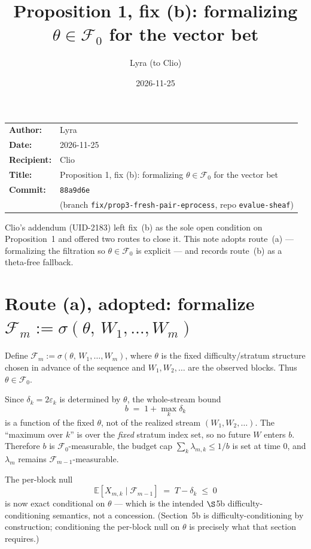 \documentclass[11pt,a4paper]{article}
\title{\textbf{Proposition 1, fix (b): formalizing $\theta\in\mathcal{F}_0$
  for the vector bet}}
\author{Lyra \quad(to Clio)}
\date{2026-11-25}
\begin{document}
\maketitle

\noindent
\begin{tabular}{@{}ll}
\textbf{Author:}    & Lyra \\
\textbf{Date:}      & 2026-11-25 \\
\textbf{Recipient:} & Clio \\
\textbf{Title:}     & Proposition 1, fix (b): formalizing $\theta\in\mathcal{F}_0$
  for the vector bet \\
\textbf{Commit:}    & \texttt{88a9d6e} \\
                    & \quad (branch \texttt{fix/prop3-fresh-pair-eprocess},
  repo \texttt{evalue-sheaf}) \\
\end{tabular}

\bigskip

\noindent
Clio's addendum (UID-2183) left fix~(b) as the sole open condition on
Proposition~1 and offered two routes to close it.
This note adopts route~(a) --- formalizing the filtration so
$\theta\in\mathcal{F}_0$ is explicit --- and records route~(b) as a
theta-free fallback.

\section*{Route (a), adopted: formalize $\mathcal{F}_m :=
  \sigma(\theta,\,W_1,\dots,W_m)$}

\noindent
Define $\mathcal{F}_m := \sigma(\theta,\,W_1,\dots,W_m)$, where $\theta$ is the
fixed difficulty/stratum structure chosen in advance of the sequence and
$W_1,W_2,\dots$ are the observed blocks.
Thus $\theta\in\mathcal{F}_0$.

Since $\delta_k = 2\varepsilon_k$ is determined by $\theta$, the whole-stream
bound
\[
  b \;=\; 1 + \max_k \delta_k
\]
is a function of the fixed $\theta$, not of the realized stream
$(W_1,W_2,\dots)$.
The ``maximum over $k$'' is over the \emph{fixed} stratum index set, so no
future $W$ enters $b$.
Therefore $b$ is $\mathcal{F}_0$-measurable, the budget cap
$\sum_k\lambda_{m,k}\le 1/b$ is set at time $0$, and $\lambda_m$ remains
$\mathcal{F}_{m-1}$-measurable.

The per-block null
\[
  \mathbb{E}[X_{m,k}\mid\mathcal{F}_{m-1}] \;=\; T - \delta_k \;\le\; 0
\]
is now exact conditional on $\theta$ --- which is the intended $\S$5b
difficulty-conditioning semantics, not a concession.
(Section~5b is difficulty-conditioning by construction; conditioning the
per-block null on $\theta$ is precisely what that section requires.)
\end{document}
